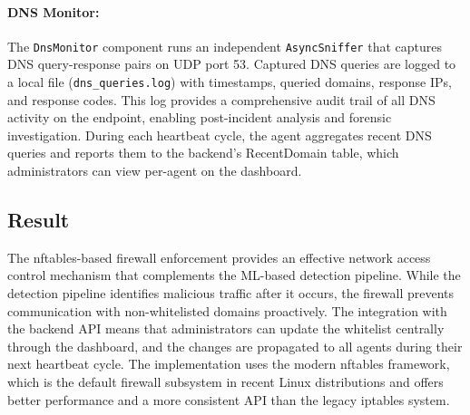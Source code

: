 \documentclass[../Main.tex]{subfiles}
\begin{document}
\paragraph{DNS Monitor:} The \texttt{DnsMonitor} component runs an independent \texttt{AsyncSniffer} that captures DNS query-response pairs on UDP port 53. Captured DNS queries are logged to a local file (\texttt{dns\_queries.log}) with timestamps, queried domains, response IPs, and response codes. This log provides a comprehensive audit trail of all DNS activity on the endpoint, enabling post-incident analysis and forensic investigation. During each heartbeat cycle, the agent aggregates recent DNS queries and reports them to the backend's RecentDomain table, which administrators can view per-agent on the dashboard.

\subsection{Result}

The nftables-based firewall enforcement provides an effective network access control mechanism that complements the ML-based detection pipeline. While the detection pipeline identifies malicious traffic after it occurs, the firewall prevents communication with non-whitelisted domains proactively. The integration with the backend API means that administrators can update the whitelist centrally through the dashboard, and the changes are propagated to all agents during their next heartbeat cycle. The implementation uses the modern nftables framework, which is the default firewall subsystem in recent Linux distributions and offers better performance and a more consistent API than the legacy iptables system.
\end{document}
